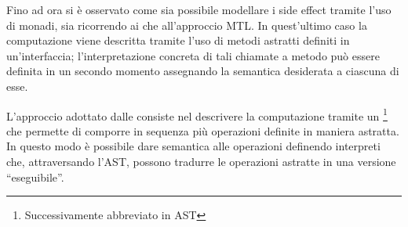 Fino ad ora si è osservato come sia possibile modellare i side effect tramite l'uso di monadi, sia ricorrendo ai  che all'approccio \ac{MTL}. In quest'ultimo caso la computazione viene descritta tramite l'uso di metodi astratti definiti in un'interfaccia; l'interpretazione concreta di tali chiamate a metodo può essere definita in un secondo momento assegnando la semantica desiderata a ciascuna di esse.

L'approccio adottato dalle  consiste nel descrivere la computazione tramite un \footnote{Successivamente abbreviato in AST} che permette di comporre in sequenza più operazioni definite in maniera astratta. In questo modo è possibile dare semantica alle operazioni definendo interpreti che, attraversando l'AST, possono tradurre le operazioni astratte in una versione ``eseguibile''.
